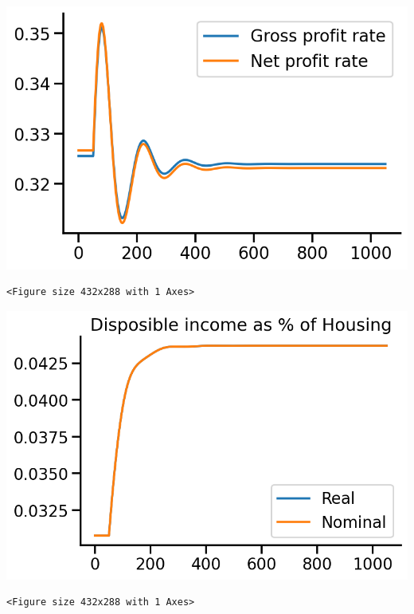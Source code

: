 \documentclass[11pt]{article}
\begin{document}
\begin{center}
\includegraphics[width=.9\linewidth]{obipy-resources/833ba20b4aec1c9746a2e4fcac62a826eabb201d/c30d640ac744f4f7f5d4a29921d32bf8bf0edb34.png}
\end{center}

\begin{verbatim}
<Figure size 432x288 with 1 Axes>
\end{verbatim}


\begin{center}
\includegraphics[width=.9\linewidth]{obipy-resources/833ba20b4aec1c9746a2e4fcac62a826eabb201d/c9457bec4f138b80843085fcac1c1e97533c075e.png}
\end{center}

\begin{verbatim}
<Figure size 432x288 with 1 Axes>
\end{verbatim}
\end{document}
